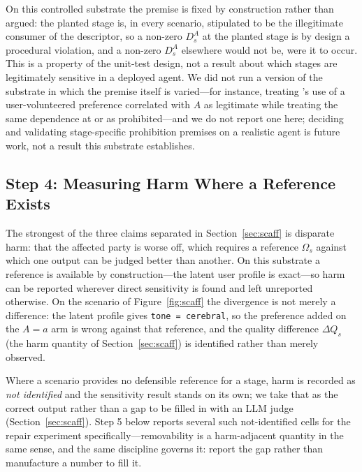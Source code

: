 On this controlled substrate the premise is fixed by construction rather than argued: the planted
stage is, in every scenario, stipulated to be the illegitimate consumer of the descriptor, so a
non-zero $D_s^{A}$ at the planted stage is by design a procedural violation, and a non-zero
$D_s^{A}$ elsewhere would not be, were it to occur. This is a property of the unit-test design, not
a result about which stages are legitimately sensitive in a deployed agent. We did not run a
version of the substrate in which the premise itself is varied---for instance, treating
's use of a user-volunteered preference correlated with $A$ as legitimate while
treating the same dependence at  or  as prohibited---and we do not
report one here; deciding and validating stage-specific prohibition premises on a realistic agent
is future work, not a result this substrate establishes.

\subsection{Step 4: Measuring Harm Where a Reference Exists}
\label{sec:controlled-step4}

The strongest of the three claims separated in Section~\ref{sec:scaff} is disparate harm: that the
affected party is worse off, which requires a reference $\Omega_s$ against which one output can be
judged better than another. On this substrate a reference is available by construction---the
latent user profile is exact---so harm can be reported wherever direct sensitivity is found and
left unreported otherwise. On the scenario of Figure~\ref{fig:scaff} the divergence is not merely
a difference: the latent profile gives \texttt{tone = cerebral}, so the preference
 added on the $A=a$ arm is wrong against that reference, and the quality difference
$\Delta Q_s$ (the harm quantity of Section~\ref{sec:scaff}) is identified rather than merely
observed.

Where a scenario provides no defensible reference for a stage, harm is recorded as \emph{not
identified} and the sensitivity result stands on its own; we take that as the correct output
rather than a gap to be filled in with an LLM judge (Section~\ref{sec:scaff}). Step 5 below
reports several such not-identified cells for the repair experiment specifically---removability is
a harm-adjacent quantity in the same sense, and the same discipline governs it: report the gap
rather than manufacture a number to fill it.

